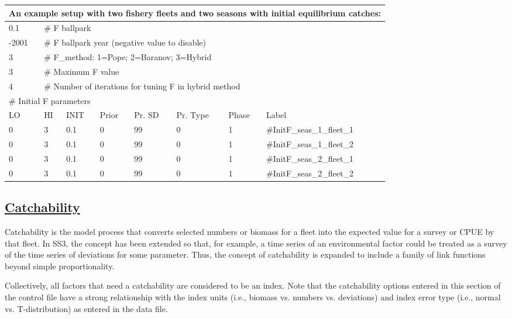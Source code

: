 \begin{longtable}{p{1.3cm} p{1cm} p{1cm} p{1cm} p{1.5cm} p{1.2cm} p{1cm} p{2.5cm}}
	\multicolumn{8}{l}{An example setup with two fishery fleets and two seasons with initial equilibrium catches:} \\
	\hline
	0.1 & \multicolumn{7}{l}{\# F ballpark} \Tstrut\Bstrut\\
	\hline
	-2001 & \multicolumn{7}{l}{\# F ballpark year (negative value to disable)} \Tstrut\Bstrut\\
	\hline
	3 & \multicolumn{7}{l}{\# F\_method: 1=Pope; 2=Baranov; 3=Hybrid} \Tstrut\Bstrut\\
	\hline
	3 & \multicolumn{7}{l}{\# Maximum F value} \Tstrut\Bstrut\\
	\hline
	4 & \multicolumn{7}{l}{\# Number of iterations for tuning F in hybrid method} \Tstrut\Bstrut\\
	\hline
	\multicolumn{8}{l}{\# Initial F parameters} \Tstrut\Bstrut\\
	LO & HI & INIT & Prior & Pr. SD & Pr. Type & Phase & Label \Bstrut\\
	\hline
	0 & 3 & 0.1 & 0 & 99 & 0 & 1 & \#InitF\_seas\_1\_fleet\_1 \Tstrut\\
	\hline
	0 & 3 & 0.1 & 0 & 99 & 0 & 1 & \#InitF\_seas\_1\_fleet\_2 \Tstrut\\
	\hline
	0 & 3 & 0.1 & 0 & 99 & 0 & 1 & \#InitF\_seas\_2\_fleet\_1 \Tstrut\\
	\hline
	0 & 3 & 0.1 & 0 & 99 & 0 & 1 & \#InitF\_seas\_2\_fleet\_2 \Tstrut\\
	\hline
\end{longtable}


\hypertarget{Qsetup}{}
\subsection[Catchability]{\protect\hyperlink{Qsetup}{Catchability}}
Catchability is the model process that converts selected numbers or biomass for a fleet into the expected value for a survey or CPUE by that fleet. In SS3, the concept has been extended so that, for example, a time series of an environmental factor could be treated as a survey of the time series of deviations for some parameter. Thus, the concept of catchability is expanded to include a family of link functions beyond simple proportionality.

Collectively, all factors that need a catchability are considered to be an index. Note that the catchability options entered in this section of the control file have a strong relationship with the index units (i.e., biomass vs. numbers vs. deviations) and index error type (i.e., normal vs. T-distribution) as entered in the data file.

